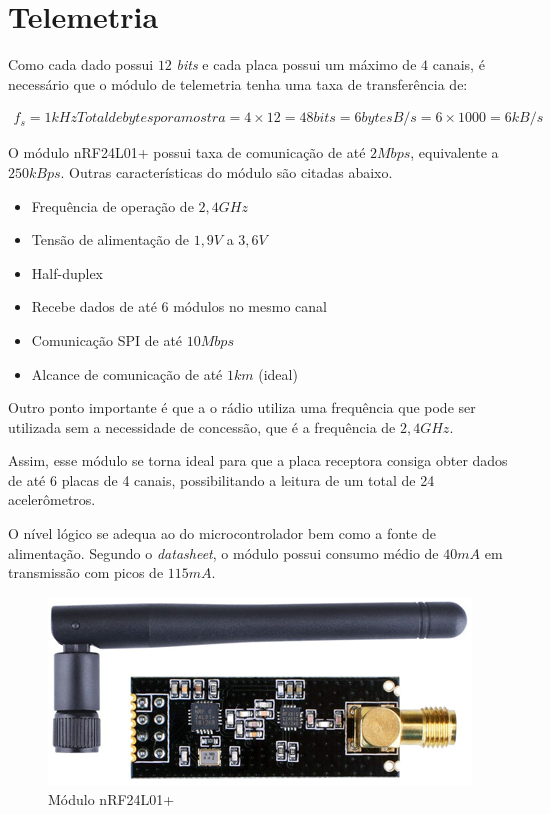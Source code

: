\documentclass[
	12pt,				%
	openright,			%
	twoside,			%
	a4paper,			%
	english,			%
	french,				%
	spanish,			%
	brazil,				%
	]{abntex2}
\begin{document}
	\section{Telemetria}
		Como cada dado possui $12$ \textit{bits} e cada placa possui um
		máximo de $4$ canais, é necessário que o módulo de telemetria
		tenha uma taxa de transferência de:

		\begin{gather*}
			f_s = 1kHz
			Total de bytes por amostra = 4\times 12 = 48 bits = 6 bytes
			B/s = 6\times 1000 = 6kB/s
		\end{gather*}

		O módulo nRF24L01+\cite{nrf} possui taxa de comunicação de até $2Mbps$,
		equivalente a $250kBps$. Outras características do módulo são
		citadas abaixo.

		\begin{itemize}
			\item Frequência de operação de $2,4GHz$
			\item Tensão de alimentação de $1,9V$ a $3,6V$
			\item Half-duplex
			\item Recebe dados de até 6 módulos no mesmo canal
			\item Comunicação SPI de até $10Mbps$
			\item Alcance de comunicação de até $1km$ (ideal)
		\end{itemize}

		Outro ponto importante é que a o rádio utiliza uma frequência que pode ser utilizada sem a necessidade de concessão, que é a frequência de $2,4GHz$.

		Assim, esse módulo se torna ideal para que a placa receptora consiga
		obter dados de até 6 placas de 4 canais, possibilitando a leitura de
		um total de 24 acelerômetros.

		O nível lógico se adequa ao do microcontrolador bem como a fonte
		de alimentação. Segundo o \textit{datasheet}, o módulo possui
		consumo médio de $40mA$ em transmissão com picos de $115mA$.
		
		\begin{figure}[!ht]
			\centering
			\includegraphics[scale = 0.6]{../Fotos/nrf.png}
			\caption[Módulo nRF24L01+]{Módulo nRF24L01+ \footnotemark}
		\end{figure}
\end{document}
